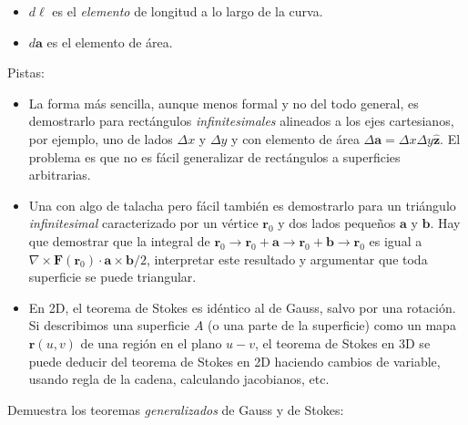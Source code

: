 \documentclass{exam}
\begin{document}
\begin{questions}
\begin{itemize}
  \item $d\bm \ell$ es el {\em elemento} de longitud a lo largo de la
    curva.
  \item $d\bm a$ es el elemento de área.
  \end{itemize}
  Pistas:
  \begin{itemize}
  \item La forma más sencilla, aunque menos formal y no del todo general, es demostrarlo
    para rectángulos {\em infinitesimales} alineados a los ejes
    cartesianos, por ejemplo, uno de lados $\Delta x$ y $\Delta y$ y
    con elemento de área $\Delta \bm a=\Delta
    x\Delta y\hat{\bm z}$. El problema es que no es fácil generalizar de rectángulos a
    superficies arbitrarias.
  \item Una con algo de talacha pero fácil también es demostrarlo para
    un triángulo {\em infinitesimal} caracterizado por un vértice $\bm
    r_0$ y dos lados pequeños $\bm a$ y $\bm b$. Hay que demostrar que
    la integral de $\bm r_0\to\bm r_0+\bm a\to\bm r_0+\bm b\to\bm r_0$
    es igual a $\nabla\times\bm F(\bm r_0)\cdot\bm a\times\bm b/2$,
    interpretar este resultado y argumentar que toda superficie se
    puede triangular.
  \item En 2D, el teorema de Stokes es idéntico al de
    Gauss, salvo por una rotación. Si describimos una superficie $A$ (o una
    parte de la superficie) como un mapa $\bm r(u,v)$ de una región en el plano
    $u-v$, el teorema de Stokes en 3D se puede deducir del teorema de
    Stokes en 2D haciendo cambios de variable, usando regla de la
    cadena, calculando jacobianos, etc.
  \end{itemize}
  \question Demuestra los teoremas {\em generalizados} de Gauss y de Stokes:
\end{questions}
\end{document}
